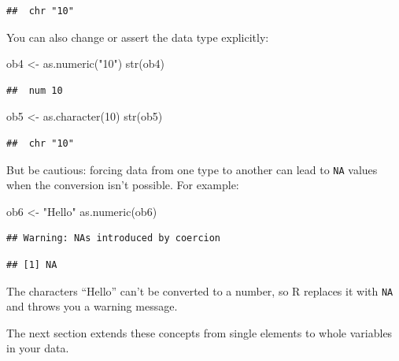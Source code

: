 \documentclass[
]{book}
\newenvironment{Shaded}{\begin{snugshade}}{\end{snugshade}}
\newcommand{\DecValTok}[1]{\textcolor[rgb]{0.00,0.00,0.81}{#1}}
\newcommand{\FunctionTok}[1]{\textcolor[rgb]{0.00,0.00,0.00}{#1}}
\newcommand{\NormalTok}[1]{#1}
\newcommand{\OtherTok}[1]{\textcolor[rgb]{0.56,0.35,0.01}{#1}}
\newcommand{\StringTok}[1]{\textcolor[rgb]{0.31,0.60,0.02}{#1}}
\begin{document}
\begin{verbatim}
##  chr "10"
\end{verbatim}

You can also change or assert the data type explicitly:

\begin{Shaded}
\begin{Highlighting}[]
\NormalTok{ob4 }\OtherTok{\textless{}{-}} \FunctionTok{as.numeric}\NormalTok{(}\StringTok{"10"}\NormalTok{)}
\FunctionTok{str}\NormalTok{(ob4)}
\end{Highlighting}
\end{Shaded}

\begin{verbatim}
##  num 10
\end{verbatim}

\begin{Shaded}
\begin{Highlighting}[]
\NormalTok{ob5 }\OtherTok{\textless{}{-}} \FunctionTok{as.character}\NormalTok{(}\DecValTok{10}\NormalTok{)}
\FunctionTok{str}\NormalTok{(ob5)}
\end{Highlighting}
\end{Shaded}

\begin{verbatim}
##  chr "10"
\end{verbatim}

But be cautious: forcing data from one type to another can lead to \texttt{NA} values when the conversion isn't possible. For example:

\begin{Shaded}
\begin{Highlighting}[]
\NormalTok{ob6 }\OtherTok{\textless{}{-}} \StringTok{"Hello"}
\FunctionTok{as.numeric}\NormalTok{(ob6)}
\end{Highlighting}
\end{Shaded}

\begin{verbatim}
## Warning: NAs introduced by coercion
\end{verbatim}

\begin{verbatim}
## [1] NA
\end{verbatim}

The characters ``Hello'' can't be converted to a number, so R replaces it with \texttt{NA} and throws you a warning message.

The next section extends these concepts from single elements to whole variables in your data.
\end{document}
